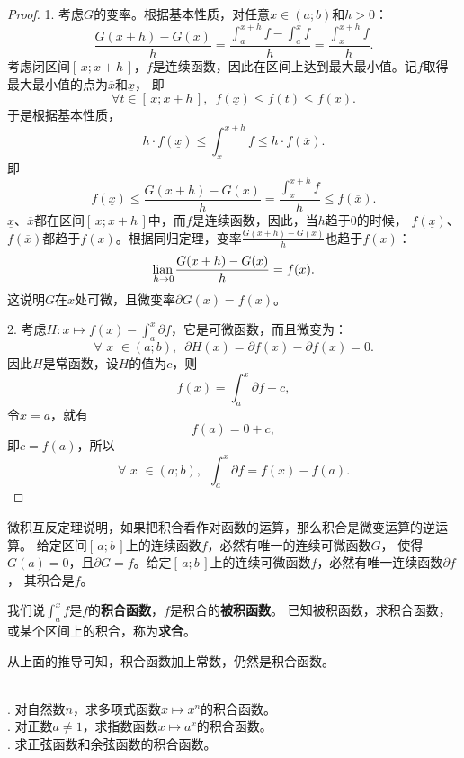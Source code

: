 \documentclass[12pt,UTF8]{ctexbook}
\begin{document}
\begin{proof}
    1. 考虑$G$的变率。根据基本性质，对任意$x\in(a; b)$和$h>0$：
    $$ \frac{G(x+h) - G(x)}{h} = \frac{\int_a^{x+h} f - \int_a^x f}{h} = \frac{\int_x^{x+h} f}{h}. $$
    考虑闭区间$[\,x; x+h\,]$，$f$是连续函数，因此在区间上达到最大最小值。记$f$取得最大最小值的点为$\overline{x}$和$\underline{x}$，
    即
    $$ \forall t \in [\,x; x+h\,] ,\,\,\, f(\underline{x}) \leqslant f(t) \leqslant f(\overline{x}). $$
    于是根据基本性质，
    $$ h\cdot f(\underline{x}) \leqslant \int_x^{x+h} f \leqslant h\cdot f(\overline{x}). $$
    即
    $$ f(\underline{x}) \leqslant \frac{G(x+h) - G(x)}{h} = \frac{\int_x^{x+h} f}{h} \leqslant f(\overline{x}). $$
    $\underline{x}$、$\overline{x}$都在区间$[\,x; x+h\,]$中，而$f$是连续函数，因此，当$h$趋于$0$的时候，
    $f(\underline{x})$、$f(\overline{x})$都趋于$f(x)$。根据同归定理，变率$\frac{G(x+h) - G(x)}{h}$也趋于$f(x)$：
    $$ \underset{h\to 0}{\operatorname{lian}\,} \frac{G(x+h) - G(x)}{h} = f(x).$$
    这说明$G$在$x$处可微，且微变率$\partial G (x) = f(x)$。

    2. 考虑$H: x\mapsto f(x) - \int_a^x \partial f$，它是可微函数，而且微变为：
    $$ \forall \,\, x\,\,\in(a; b), \,\,\, \partial H(x) = \partial f(x) - \partial f(x) = 0. $$
    因此$H$是常函数，设$H$的值为$c$，则
    $$f(x) = \int_a^x \partial f + c, $$
    令$x = a$，就有
    $$f(a) = 0 + c,$$
    即$c = f(a)$，所以
    $$ \forall \,\, x\,\,\in(a; b), \,\,\,\int_a^x \partial f = f(x) - f(a).$$

\end{proof}

微积互反定理说明，如果把积合看作对函数的运算，那么积合是微变运算的逆运算。
给定区间$[\,a; b\,]$上的连续函数$f$，必然有唯一的连续可微函数$G$，
使得$G(a) = 0$，且$\partial G = f$。给定$[\,a; b\,]$上的连续可微函数$f$，必然有唯一连续函数$\partial f$，
其积合是$f$。

我们说$\int_a^x f$是$f$的\textbf{积合函数}，$f$是积合的\textbf{被积函数}。
已知被积函数，求积合函数，或某个区间上的积合，称为\textbf{求合}。

从上面的推导可知，积合函数加上常数，仍然是积合函数。

\begin{et}
    \mbox{} \\
    . 对自然数$n$，求多项式函数$x\mapsto x^n$的积合函数。\\
    . 对正数$a\neq 1$，求指数函数$x\mapsto a^x$的积合函数。\\
    . 求正弦函数和余弦函数的积合函数。
\end{et}
\end{document}
